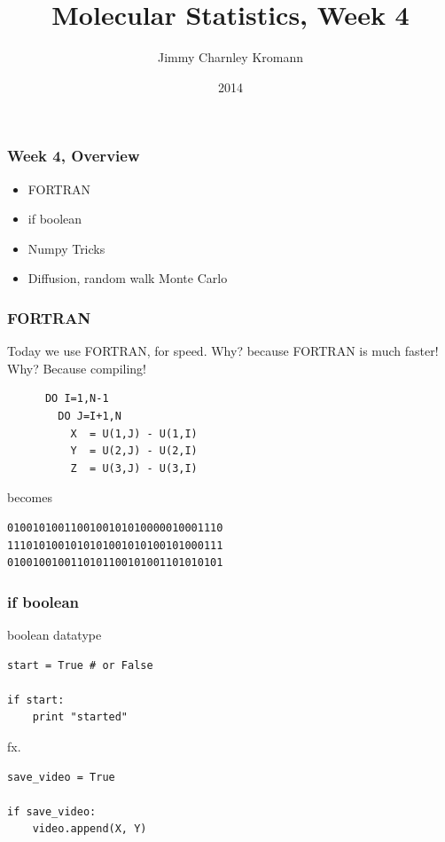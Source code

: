 \documentclass{beamer}
\title[]{Molecular Statistics, Week 4}
\institute[University of Copenhagen]{Department of Chemistry \\ University of Copenhagen}
\author[Jimmy Charnley Kromann]{Jimmy Charnley Kromann}
\date{2014}
\begin{document}
\frame[plain]{\titlepage}


\begin{frame}[fragile]

    \frametitle{Week 4, Overview}

    \begin{itemize}

        \item FORTRAN

        \item if boolean

        \item Numpy Tricks

        \item Diffusion, random walk Monte Carlo

    \end{itemize}

\end{frame}


\begin{frame}[fragile]

    \frametitle{FORTRAN}

    Today we use FORTRAN, for speed. Why?\newline
    because FORTRAN is much faster! Why?
    Because compiling!

\begin{lstlisting}
      DO I=1,N-1
        DO J=I+1,N
          X  = U(1,J) - U(1,I)
          Y  = U(2,J) - U(2,I)
          Z  = U(3,J) - U(3,I)
\end{lstlisting}

    becomes

\begin{lstlisting}
0100101001100100101010000010001110
1110101001010101001010100101000111
0100100100110101100101001101010101
\end{lstlisting}


\end{frame}


\begin{frame}[fragile]

    \frametitle{if boolean}

    boolean datatype

\begin{lstlisting}
start = True # or False

if start:
    print "started"

\end{lstlisting}

fx.

\begin{lstlisting}
save_video = True

if save_video:
    video.append(X, Y)

\end{lstlisting}


\end{frame}
\end{document}
